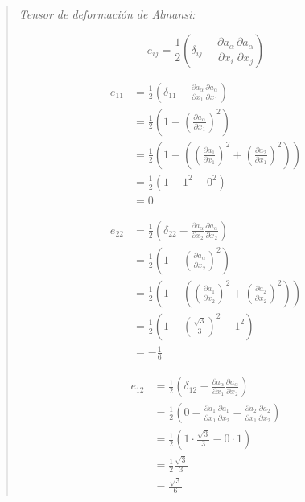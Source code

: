 \documentclass[a4paper,10pt,twoside,final,spanish]{article}
\begin{document}
\begin{quote}
\textit{Tensor de deformación de Almansi:}

\[
e_{ij}=
\frac{1}{2}\left(
\delta_{ij}-
\frac{\partial a_{\alpha}}{\partial x_{i}}
\frac{\partial a_{\alpha}}{\partial x_{j}}
\right)
\]

\begin{minipage}{0.5\linewidth}

\begin{align*}
e_{11} &=
\frac{1}{2}\left(\delta_{11}-
\frac{\partial a_{\alpha}}{\partial x_{1}}
\frac{\partial a_{\alpha}}{\partial x_{1}}
\right) \\
&=
\frac{1}{2}\left(1-
\left(\frac{\partial a_{\alpha}}{\partial x_{1}}\right)^{2}
\right) \\
&=
\frac{1}{2}\left(1-\left(
\left(\frac{\partial a_{1}}{\partial x_{1}}\right)^{2}
+\left(\frac{\partial a_{2}}{\partial x_{1}}\right)^{2}
\right)\right) \\
&=
\frac{1}{2}(1-1^{2}-0^{2}) \\
&=0
\end{align*}

\end{minipage} \hfill \begin{minipage}{0.5\linewidth}

\begin{align*}
e_{22} &=
\frac{1}{2}\left(\delta_{22}-
\frac{\partial a_{\alpha}}{\partial x_{2}}
\frac{\partial a_{\alpha}}{\partial x_{2}}
\right) \\
&=
\frac{1}{2}\left(1-
\left(\frac{\partial a_{\alpha}}{\partial x_{2}}\right)^{2}
\right) \\
&=
\frac{1}{2}\left(1-\left(
\left(\frac{\partial a_{1}}{\partial x_{2}}\right)^{2}
+\left(\frac{\partial a_{2}}{\partial x_{2}}\right)^{2}
\right)\right) \\
&=
\frac{1}{2}\left(1-\left(\frac{\sqrt{3}}{3}\right)^{2}-1^{2}\right) \\
&=-\frac{1}{6}
\end{align*}

\end{minipage}

\begin{minipage}{0.5\linewidth}

\begin{align*}
e_{12} &=
\frac{1}{2}\left(\delta_{12}-
\frac{\partial a_{\alpha}}{\partial x_{1}}
\frac{\partial a_{\alpha}}{\partial x_{2}}
\right) \\
&=
\frac{1}{2}\left(0-
\frac{\partial a_{1}}{\partial x_{1}}
\frac{\partial a_{1}}{\partial x_{2}}
-\frac{\partial a_{2}}{\partial x_{1}}
\frac{\partial a_{2}}{\partial x_{2}}
\right) \\
&=
\frac{1}{2}\left(
1\cdot
\frac{\sqrt{3}}{3}
-0\cdot
1
\right) \\
&=
\frac{1}{2}\frac{\sqrt{3}}{3} \\
&=\frac{\sqrt{3}}{6}
\end{align*}


\end{minipage}
\end{quote}
\end{document}
